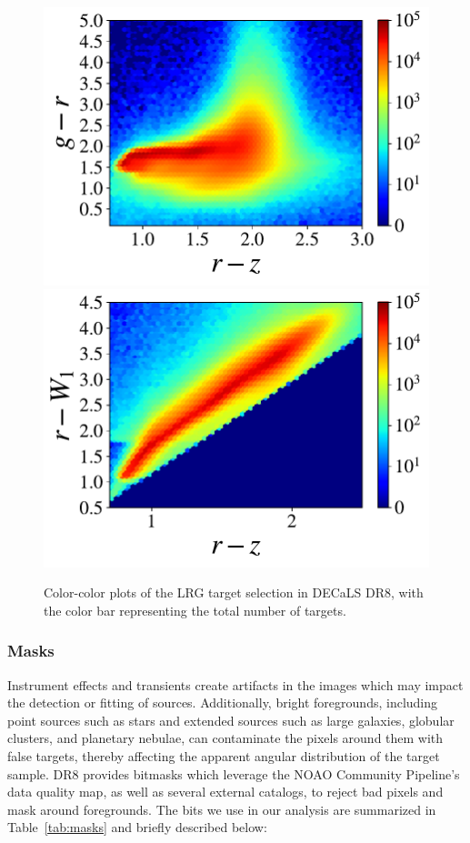 \begin{figure}
\centering
\includegraphics[width=0.7\columnwidth, trim={0.35cm 0 0 0},clip]{figures/LRG_colorcolor_grz.pdf}
\includegraphics[width=0.7\columnwidth, trim={0.35cm 0 0 0},clip]{figures/LRG_colorcolor_rzW1.pdf}
\caption{Color-color plots of the LRG target selection in DECaLS DR8, with the color bar representing the total number of targets.}
\label{fig:colorcolor}
\end{figure}


\subsubsection{Masks}
\label{sec:data:masks}

Instrument effects and transients create artifacts in the images which may impact the detection or fitting of sources. Additionally, bright foregrounds, including point sources such as stars and extended sources such as large galaxies, globular clusters, and planetary nebulae, can contaminate the pixels around them with false targets, thereby affecting the apparent angular distribution of the target sample. DR8 provides bitmasks which leverage the NOAO Community Pipeline's data quality map, as well as several external catalogs, to reject bad pixels and mask around foregrounds. The bits we use in our analysis are summarized in Table~\ref{tab:masks} and briefly described below:


